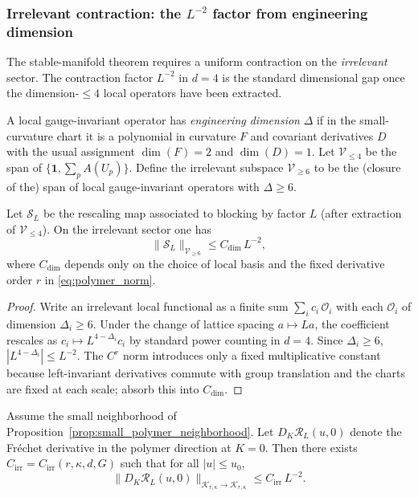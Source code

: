 \subsubsection{Irrelevant contraction: the \texorpdfstring{$L^{-2}$}{L-2} factor from engineering dimension}
\label{subsec:irrelevant_contraction}

The stable-manifold theorem requires a uniform contraction on the \emph{irrelevant} sector.
The contraction factor $L^{-2}$ in $d=4$ is the standard dimensional gap once the dimension-$\le 4$ local operators have been extracted.

\begin{definition}
A local gauge-invariant operator has \emph{engineering dimension} $\Delta$ if in the small-curvature chart it is a polynomial in curvature
$F$ and covariant derivatives $D$ with the usual assignment $\dim(F)=2$ and $\dim(D)=1$.
Let $\mathscr V_{\le 4}$ be the span of $\{\mathbf 1,\sum_p A(U_p)\}$.
Define the irrelevant subspace $\mathscr V_{\ge 6}$ to be the (closure of the) span of local gauge-invariant operators with
$\Delta\ge 6$.
\end{definition}

\begin{lemma}\label{lem:rescaling_dim_bound}
Let $\mathcal S_L$ be the rescaling map associated to blocking by factor $L$ (after extraction of $\mathscr V_{\le 4}$).
On the irrelevant sector one has
\[
\|\mathcal S_L\|_{\mathscr V_{\ge 6}}\le C_{\mathrm{dim}}\,L^{-2},
\]
where $C_{\mathrm{dim}}$ depends only on the choice of local basis and the fixed derivative order $r$ in \eqref{eq:polymer_norm}.
\end{lemma}

\begin{proof}
Write an irrelevant local functional as a finite sum $\sum_i c_i\,\mathcal O_i$ with each $\mathcal O_i$ of dimension $\Delta_i\ge 6$.
Under the change of lattice spacing $a\mapsto La$, the coefficient rescales as
$c_i\mapsto L^{4-\Delta_i}c_i$ by standard power counting in $d=4$.
Since $\Delta_i\ge 6$, $|L^{4-\Delta_i}|\le L^{-2}$.
The $C^r$ norm introduces only a fixed multiplicative constant because left-invariant derivatives commute with group translation and the
charts are fixed at each scale; absorb this into $C_{\mathrm{dim}}$.
\end{proof}

\begin{proposition}\label{prop:irrelevant_linear_contraction}
Assume the small neighborhood of Proposition~\ref{prop:small_polymer_neighborhood}.
Let $D_K\mathcal R_L(u,0)$ denote the Fr\'echet derivative in the polymer direction at $K=0$.
Then there exists $C_{\mathrm{irr}}=C_{\mathrm{irr}}(r,\kappa,d,G)$ such that for all $|u|\le u_0$,
\[
\|D_K\mathcal R_L(u,0)\|_{\mathcal K_{r,\kappa}\to\mathcal K_{r,\kappa}}\le C_{\mathrm{irr}}\,L^{-2}.
\]
\end{proposition}

